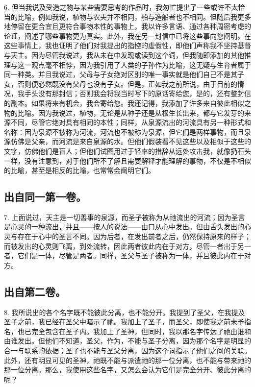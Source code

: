 6. 但当我说及受造之物与某些需要思考的作品时，我匆忙提出了一些或许不太恰当的比喻，例如我说，植物与农夫并不相同，船与造船者也不相同。但随后我更多地停留在更合宜且更符合事物本性的事物上，我以许多言语、通过各种周密考虑的论证，阐述了哪些事物更为真实。此外，我在另一封信中已将这些事向您阐明。在这些事情上，我也证明了他们对我提出的指控的虚假性，即他们声称我不坚持基督与天主。因为尽管我说过，我从未在中发现或读到这个词，但我随即添加的其他推理与这一观点毫不相悖，因为我引用了人类的子孙作为比喻，这无疑与生育者属于同一种类。并且我说过，父母与子女绝对区别的唯一事实就是他们自己不是其子女，否则便必然既没有父母也没有子女。但是，正如我之前所说，由于目前的情况，我手头没有那封信；否则我会将我当时写下的原话寄给您，是的，还有整封信的副本。如果将来有机会，我会寄给您。我还记得，我添加了许多来自彼此相似之物的比喻。因为我说过，植物，无论是从种子还是从根生长出来，都与它发芽的来源不同，尽管它绝对具有相同的本性；同样，从泉源流出的河流具有另一种形式和名称：因为泉源不被称为河流，河流也不被称为泉源，但它们是两样事物，而且泉源仿佛是父亲，而河流是来自泉源的水。但他们假装看不见这些以及相似于这些的文字，仿佛他们是盲人；但他们试图用过于轻率的措辞从远处攻击我，就像扔石头一样，没有注意到，对于他们所不了解且需要解释才能理解的事物，不仅是不相似的比喻，甚至是相反的比喻，也常常会阐明它们。\par


\subsection{出自同一第一卷。}

7. 上面说过，天主是一切善事的泉源，而圣子被称为从祂流出的河流；因为圣言是心灵的一种流出，并且——按人的说法——由口从心中发出。但由舌头发出的心灵与存在于心中的圣言不同。因为后者，在发出前者之后，仍然保持原来的样子；而被发出的心灵则飞离，到处流转，因此两者彼此内在于对方，尽管一者出于另一者，它们是一体，尽管是两者。同样，圣父与圣子被称为一体，并且彼此内在于对方。\par


\subsection{出自第二卷。}

8. 我所说出的各个名字既不能彼此分离，也不能分开。我提到了圣父，在我提及圣子之前，我已经在圣父中暗示了祂。我加上了圣子，而圣父，即使我之前未予指名，也已完全包含在圣子内。我加上了圣神，但同时，我以那名字传达了祂由谁和由谁发出。但他们不知道，圣父，作为，不能与圣子分离，因为那个名字是明显的合一与联系的依据；圣子也不能与圣父分离，因为这个词指示了他们之间的关联。此外，还有明显可见的圣神，祂既不能与派遣祂的那一位分离，也不能与带来祂的那一位分离。那么，我使用这些名字，又怎么会认为它们是完全分开、彼此分离的呢？\par


